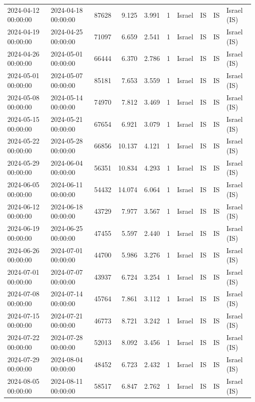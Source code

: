 \begin{tabular}{llrrrlllll}
2024-04-12 00:00:00 & 2024-04-18 00:00:00 & 87628 & 9.125 & 3.991 & 1 & Israel & IS & IS & Israel (IS) \\
2024-04-19 00:00:00 & 2024-04-25 00:00:00 & 71097 & 6.659 & 2.541 & 1 & Israel & IS & IS & Israel (IS) \\
2024-04-26 00:00:00 & 2024-05-01 00:00:00 & 66444 & 6.370 & 2.786 & 1 & Israel & IS & IS & Israel (IS) \\
2024-05-01 00:00:00 & 2024-05-07 00:00:00 & 85181 & 7.653 & 3.559 & 1 & Israel & IS & IS & Israel (IS) \\
2024-05-08 00:00:00 & 2024-05-14 00:00:00 & 74970 & 7.812 & 3.469 & 1 & Israel & IS & IS & Israel (IS) \\
2024-05-15 00:00:00 & 2024-05-21 00:00:00 & 67654 & 6.921 & 3.079 & 1 & Israel & IS & IS & Israel (IS) \\
2024-05-22 00:00:00 & 2024-05-28 00:00:00 & 66856 & 10.137 & 4.121 & 1 & Israel & IS & IS & Israel (IS) \\
2024-05-29 00:00:00 & 2024-06-04 00:00:00 & 56351 & 10.834 & 4.293 & 1 & Israel & IS & IS & Israel (IS) \\
2024-06-05 00:00:00 & 2024-06-11 00:00:00 & 54432 & 14.074 & 6.064 & 1 & Israel & IS & IS & Israel (IS) \\
2024-06-12 00:00:00 & 2024-06-18 00:00:00 & 43729 & 7.977 & 3.567 & 1 & Israel & IS & IS & Israel (IS) \\
2024-06-19 00:00:00 & 2024-06-25 00:00:00 & 47455 & 5.597 & 2.440 & 1 & Israel & IS & IS & Israel (IS) \\
2024-06-26 00:00:00 & 2024-07-01 00:00:00 & 44700 & 5.986 & 3.276 & 1 & Israel & IS & IS & Israel (IS) \\
2024-07-01 00:00:00 & 2024-07-07 00:00:00 & 43937 & 6.724 & 3.254 & 1 & Israel & IS & IS & Israel (IS) \\
2024-07-08 00:00:00 & 2024-07-14 00:00:00 & 45764 & 7.861 & 3.112 & 1 & Israel & IS & IS & Israel (IS) \\
2024-07-15 00:00:00 & 2024-07-21 00:00:00 & 46773 & 8.721 & 3.242 & 1 & Israel & IS & IS & Israel (IS) \\
2024-07-22 00:00:00 & 2024-07-28 00:00:00 & 52013 & 8.092 & 3.456 & 1 & Israel & IS & IS & Israel (IS) \\
2024-07-29 00:00:00 & 2024-08-04 00:00:00 & 48452 & 6.723 & 2.432 & 1 & Israel & IS & IS & Israel (IS) \\
2024-08-05 00:00:00 & 2024-08-11 00:00:00 & 58517 & 6.847 & 2.762 & 1 & Israel & IS & IS & Israel (IS) \\

\end{tabular}
